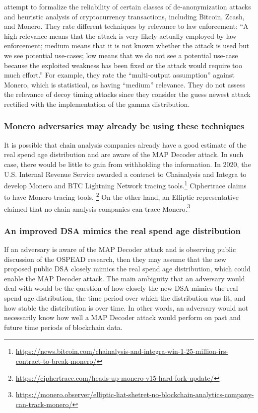 \documentclass[english]{article}
\begin{document}
\cite{Deuber2022} attempt to formalize the reliability of certain
classes of de-anonymization attacks and heuristic analysis of cryptocurrency
transactions, including Bitcoin, Zcash, and Monero. They rate different
techniques by relevance to law enforcement: ``A high relevance means
that the attack is very likely actually employed by law enforcement;
medium means that it is not known whether the attack is used but we
see potential use-cases; low means that we do not see a potential
use-case because the exploited weakness has been fixed or the attack
would require too much effort.'' For example, they rate the ``multi-output
assumption'' against Monero, which is statistical, as having ``medium''
relevance. They do not assess the relevance of decoy timing attacks
since they consider the guess newest attack rectified with the implementation
of the gamma distribution.

\subsubsection{Monero adversaries may already be using these techniques}

It is possible that chain analysis companies already have a good estimate
of the real spend age distribution and are aware of the MAP Decoder
attack. In such case, there would be little to gain from withholding
the information. In 2020, the U.S. Internal Revenue Service awarded
a contract to Chainalysis and Integra to develop Monero and BTC Lightning
Network tracing tools.\footnote{\href{https://news.bitcoin.com/chainalysis-and-integra-win-1-25-million-irs-contract-to-break-monero/}{https://news.bitcoin.com/chainalysis-and-integra-win-1-25-million-irs-contract-to-break-monero/}}
Ciphertrace claims to have Monero tracing tools. \footnote{\href{https://ciphertrace.com/heads-up-monero-v15-hard-fork-update/}{https://ciphertrace.com/heads-up-monero-v15-hard-fork-update/}}
On the other hand, an Elliptic representative claimed that no chain
analysis companies can trace Monero.\footnote{\href{https://monero.observer/elliptic-liat-shetret-no-blockchain-analytics-company-can-track-monero/}{https://monero.observer/elliptic-liat-shetret-no-blockchain-analytics-company-can-track-monero/}}

\subsubsection{An improved DSA mimics the real spend age distribution}

If an adversary is aware of the MAP Decoder attack and is observing
public discussion of the OSPEAD research, then they may assume that
the new proposed public DSA closely mimics the real spend age distribution,
which could enable the MAP Decoder attack. The main ambiguity that
an adversary would deal with would be the question of how closely
the new DSA mimics the real spend age distribution, the time period
over which the distribution was fit, and how stable the distribution
is over time. In other words, an adversary would not necessarily know
how well a MAP Decoder attack would perform on past and future time
periods of blockchain data.
\end{document}
